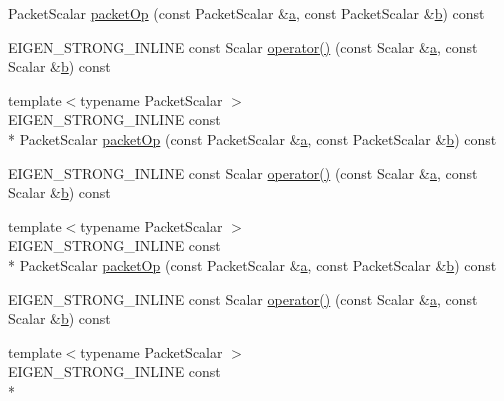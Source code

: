 \begin{DoxyCompactItemize}
Packet\-Scalar \hyperlink{struct_e_i_g_e_n___e_m_p_t_y___s_t_r_u_c_t_a1ac7c1e846531dc24381f972d7cef1e5}{packet\-Op} (const Packet\-Scalar \&\hyperlink{glext_8h_ac8729153468b5dcf13f971b21d84d4e5}{a}, const Packet\-Scalar \&\hyperlink{glext_8h_a6eba317e3cf44d6d26c04a5a8f197dcb}{b}) const 
\item 
E\-I\-G\-E\-N\-\_\-\-S\-T\-R\-O\-N\-G\-\_\-\-I\-N\-L\-I\-N\-E const Scalar \hyperlink{struct_e_i_g_e_n___e_m_p_t_y___s_t_r_u_c_t_a9800a6fef6baf202e8d4d1075d615149}{operator()} (const Scalar \&\hyperlink{glext_8h_ac8729153468b5dcf13f971b21d84d4e5}{a}, const Scalar \&\hyperlink{glext_8h_a6eba317e3cf44d6d26c04a5a8f197dcb}{b}) const 
\item 
{\footnotesize template$<$typename Packet\-Scalar $>$ }\\E\-I\-G\-E\-N\-\_\-\-S\-T\-R\-O\-N\-G\-\_\-\-I\-N\-L\-I\-N\-E const \\*
Packet\-Scalar \hyperlink{struct_e_i_g_e_n___e_m_p_t_y___s_t_r_u_c_t_a1ac7c1e846531dc24381f972d7cef1e5}{packet\-Op} (const Packet\-Scalar \&\hyperlink{glext_8h_ac8729153468b5dcf13f971b21d84d4e5}{a}, const Packet\-Scalar \&\hyperlink{glext_8h_a6eba317e3cf44d6d26c04a5a8f197dcb}{b}) const 
\item 
E\-I\-G\-E\-N\-\_\-\-S\-T\-R\-O\-N\-G\-\_\-\-I\-N\-L\-I\-N\-E const Scalar \hyperlink{struct_e_i_g_e_n___e_m_p_t_y___s_t_r_u_c_t_a9800a6fef6baf202e8d4d1075d615149}{operator()} (const Scalar \&\hyperlink{glext_8h_ac8729153468b5dcf13f971b21d84d4e5}{a}, const Scalar \&\hyperlink{glext_8h_a6eba317e3cf44d6d26c04a5a8f197dcb}{b}) const 
\item 
{\footnotesize template$<$typename Packet\-Scalar $>$ }\\E\-I\-G\-E\-N\-\_\-\-S\-T\-R\-O\-N\-G\-\_\-\-I\-N\-L\-I\-N\-E const \\*
Packet\-Scalar \hyperlink{struct_e_i_g_e_n___e_m_p_t_y___s_t_r_u_c_t_a1ac7c1e846531dc24381f972d7cef1e5}{packet\-Op} (const Packet\-Scalar \&\hyperlink{glext_8h_ac8729153468b5dcf13f971b21d84d4e5}{a}, const Packet\-Scalar \&\hyperlink{glext_8h_a6eba317e3cf44d6d26c04a5a8f197dcb}{b}) const 
\item 
E\-I\-G\-E\-N\-\_\-\-S\-T\-R\-O\-N\-G\-\_\-\-I\-N\-L\-I\-N\-E const Scalar \hyperlink{struct_e_i_g_e_n___e_m_p_t_y___s_t_r_u_c_t_a9800a6fef6baf202e8d4d1075d615149}{operator()} (const Scalar \&\hyperlink{glext_8h_ac8729153468b5dcf13f971b21d84d4e5}{a}, const Scalar \&\hyperlink{glext_8h_a6eba317e3cf44d6d26c04a5a8f197dcb}{b}) const 
\item 
{\footnotesize template$<$typename Packet\-Scalar $>$ }\\E\-I\-G\-E\-N\-\_\-\-S\-T\-R\-O\-N\-G\-\_\-\-I\-N\-L\-I\-N\-E const \\*

\end{DoxyCompactItemize}
